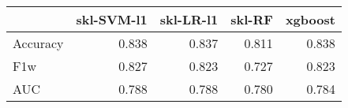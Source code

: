 \begin{tabular}{lrrrr}
\toprule
{} &  skl-SVM-l1 &  skl-LR-l1 &  skl-RF &  xgboost \\
\midrule
Accuracy &       0.838 &      0.837 &   0.811 &    0.838 \\
F1w      &       0.827 &      0.823 &   0.727 &    0.823 \\
AUC      &       0.788 &      0.788 &   0.780 &    0.784 \\
\bottomrule
\end{tabular}
